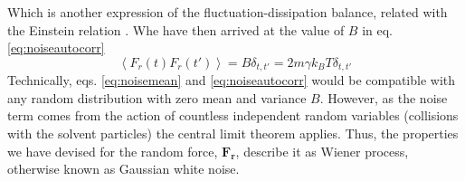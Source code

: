 \documentclass[ twoside,openright,titlepage,numbers=noenddot,%
headinclude,footinclude,cleardoublepage=empty,abstract=on,
BCOR=5mm,paper=a4,fontsize=11pt, dvipsnames
]{scrreprt}
\renewcommand{\vec}[1]{\bm{#1}}
\begin{document}
Which is another expression of the fluctuation-dissipation balance, related with the Einstein relation \cite{einsteinrelation}. Whe have then arrived at the value of $B$ in eq. \eqref{eq:noiseautocorr}
\begin{equation}
  \left\langle F_r(t)F_r(t')\right\rangle = B \delta_{t,t'} = 2m\gamma k_BT \delta_{t,t'}
\end{equation}
Technically, eqs. \eqref{eq:noisemean} and \eqref{eq:noiseautocorr} would be compatible with any random distribution with zero mean and variance $B$. However, as the noise term comes from the action of countless independent random variables (collisions with the solvent particles) the central limit theorem\cite{centrallimittheorem} applies. Thus, the properties we have devised for the random force, $\vec{F_r}$, describe it as Wiener process, otherwise known as Gaussian white noise.
\end{document}
